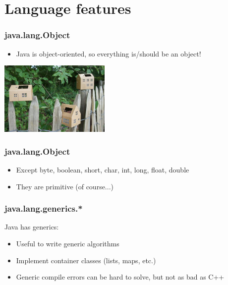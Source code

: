 
\section{Language features}


\begin{frame}
  \frametitle{java.lang.Object}

  \begin{itemize}
    \item Java is object-oriented, so everything is/should be an object!
  \end{itemize}
  \vspace{1cm}
  \begin{center}
    \includegraphics[width=0.4\textwidth]{fig/objects}
  \end{center}
\end{frame}


\begin{frame}
  \frametitle{java.lang.Object}

  \begin{itemize}
    \item Except byte, boolean, short, char, int, long, float, double
    \vspace{1cm}
    \item They are primitive (of course...)
  \end{itemize}
\end{frame}


\begin{frame}
  \frametitle{java.lang.generics.*}
  Java has generics:
  \vspace{0.25cm}
  \begin{itemize}
    \item Useful to write generic algorithms
    \vspace{0.4cm}
    \item Implement container classes (lists, maps, etc.)   
    \vspace{0.4cm}
    \item Generic compile errors can be hard to solve, but not as bad as C++
  \end{itemize}
\end{frame}


